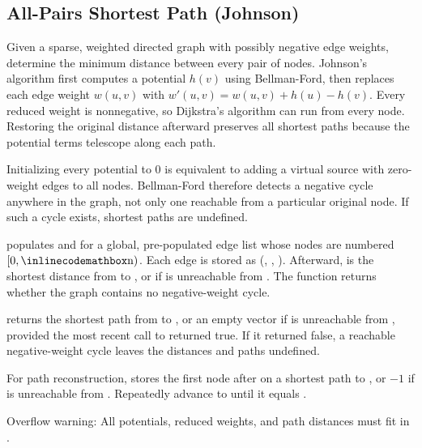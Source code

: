 \subsection{All-Pairs Shortest Path (Johnson)}
\label{sec:4.3.9}
Given a sparse, weighted directed graph with possibly negative edge weights, determine the minimum distance between every pair of nodes. Johnson's algorithm first computes a potential $h(v)$ using Bellman-Ford, then replaces each edge weight $w(u,v)$ with $w'(u,v) = w(u,v) + h(u) - h(v)$. Every reduced weight is nonnegative, so Dijkstra's algorithm can run from every node. Restoring the original distance afterward preserves all shortest paths because the potential terms telescope along each path.

Initializing every potential to $0$ is equivalent to adding a virtual source with zero-weight edges to all nodes. Bellman-Ford therefore detects a negative cycle anywhere in the graph, not only one reachable from a particular original node. If such a cycle exists, shortest paths are undefined.

\begin{compactitem}
  \item {} populates  and  for a global, pre-populated edge list  whose nodes are numbered $[0, {\inlinecodemath{n}})$. Each edge is stored as (, , ). Afterward,  is the shortest distance from  to , or  if  is unreachable from . The function returns whether the graph contains no negative-weight cycle.
  \item {} returns the shortest path from  to , or an empty vector if  is unreachable from , provided the most recent call to  returned true. If it returned false, a reachable negative-weight cycle leaves the distances and paths undefined.
\end{compactitem}

For path reconstruction,  stores the first node after  on a shortest path to , or $-1$ if  is unreachable from . Repeatedly advance  to  until it equals .

Overflow warning: All potentials, reduced weights, and path distances must fit in .

